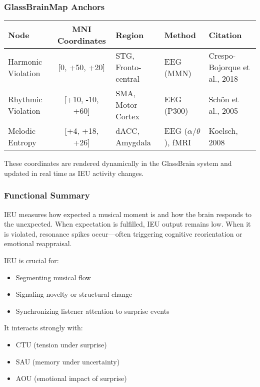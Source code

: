 \subsubsection*{GlassBrainMap Anchors}

\begin{center}
\begin{tabular}{|l|c|l|l|l|}
\hline
\textbf{Node} & \textbf{MNI Coordinates} & \textbf{Region} & \textbf{Method} & \textbf{Citation} \\
\hline
Harmonic Violation & [0, +50, +20] & STG, Fronto-central & EEG (MMN) & Crespo-Bojorque et al., 2018 \\
Rhythmic Violation & [+10, -10, +60] & SMA, Motor Cortex & EEG (P300) & Schön et al., 2005 \\
Melodic Entropy & [+4, +18, +26] & dACC, Amygdala & EEG ($\alpha$/$\theta$), fMRI & Koelsch, 2008 \\
\hline
\end{tabular}
\end{center}

These coordinates are rendered dynamically in the GlassBrain system and updated in real time as IEU activity changes.

\subsubsection*{Functional Summary}

IEU measures how expected a musical moment is and how the brain responds to the unexpected. When expectation is fulfilled, IEU output remains low. When it is violated, resonance spikes occur—often triggering cognitive reorientation or emotional reappraisal.

IEU is crucial for:

\begin{itemize}
    \item Segmenting musical flow
    \item Signaling novelty or structural change
    \item Synchronizing listener attention to surprise events
\end{itemize}

It interacts strongly with:

\begin{itemize}
    \item CTU (tension under surprise)
    \item SAU (memory under uncertainty)
    \item AOU (emotional impact of surprise)
\end{itemize}

